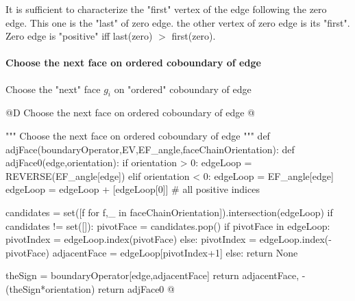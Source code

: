 \documentclass[11pt,oneside]{article}    %
\begin{document}
It is sufficient to characterize the "first" vertex of the edge following the zero edge. This one is the "last" of zero edge. the other vertex of zero edge is its "first". Zero edge is "positive" iff last(zero) $>$ first(zero).


\paragraph{Choose the next face on ordered coboundary of edge}
Choose the "next" face $g_i$  on "ordered" coboundary of edge


@D Choose the next face on ordered coboundary of edge
@{""" Choose the next face on ordered coboundary of edge """
def adjFace(boundaryOperator,EV,EF_angle,faceChainOrientation):
    def adjFace0(edge,orientation):
        if orientation > 0:  edgeLoop = REVERSE(EF_angle[edge])
        elif orientation < 0:  edgeLoop = EF_angle[edge]
        edgeLoop = edgeLoop + [edgeLoop[0]]  # all positive indices
        
        candidates = set([f for f,_ in faceChainOrientation]).intersection(edgeLoop)
        if candidates != set([]):
            pivotFace = candidates.pop()
            if pivotFace in edgeLoop:
                pivotIndex = edgeLoop.index(pivotFace)
            else:
                pivotIndex = edgeLoop.index(-pivotFace)
            adjacentFace = edgeLoop[pivotIndex+1]
        else: return None
        
        theSign = boundaryOperator[edge,adjacentFace]
        return adjacentFace, -(theSign*orientation)
    return adjFace0
@}
\end{document}
